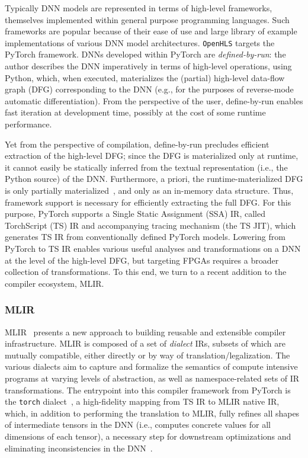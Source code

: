 \documentclass[10pt]{sig-alternate}
\begin{document}
Typically DNN models are represented in terms of high-level frameworks,
themselves implemented within general purpose programming languages.
Such frameworks are popular because of their ease of use and large
library of example implementations of various DNN model architectures.
\texttt{OpenHLS} targets the PyTorch framework.
DNNs developed within PyTorch are \emph{defined-by-run}:
the author describes the DNN imperatively in terms of high-level operations,
using Python, which, when executed, materializes the (partial) high-level
data-flow graph (DFG) corresponding to the DNN (e.g., for the purposes
of reverse-mode automatic differentiation). From the perspective of
the user, define-by-run enables fast iteration at development time,
possibly at the cost of some runtime performance.

Yet from the perspective of compilation, define-by-run
precludes efficient extraction of the high-level DFG; since the DFG
is materialized only at runtime, it cannot easily be statically inferred from
the textual representation (i.e., the Python source) of the DNN. Furthermore,
a priori, the runtime-materialized DFG is only partially materialized~\cite{paszke2017automatic},
and only as an in-memory data structure. Thus, framework support
is necessary for efficiently extracting the full DFG. For this purpose, PyTorch
supports a Single Static Assignment (SSA) IR, called TorchScript (TS)
IR and accompanying tracing mechanism (the TS JIT), which generates
TS IR from conventionally defined PyTorch models. Lowering from PyTorch
to TS IR enables various useful analyses and transformations on a
DNN at the level of the high-level DFG, but targeting FPGAs requires
a broader collection of transformations. To this end, we turn to a
recent addition to the compiler ecosystem, MLIR.

\subsubsection{MLIR}\label{subsec:MLIR}

MLIR~\cite{https://doi.org/10.48550/arxiv.2002.11054}
presents a new approach to building reusable and extensible compiler
infrastructure. MLIR is composed of a set of \emph{dialect} IRs, subsets
of which are mutually compatible, either directly or by way of translation/legalization.
The various dialects aim to capture and formalize the semantics of
compute intensive programs at varying levels of abstraction, as well
as namespace-related sets of IR transformations. The entrypoint into
this compiler framework from PyTorch is the \texttt{torch} dialect~\cite{torch-mlir}, a high-fidelity mapping from TS IR to MLIR native IR, which, in addition to performing the translation to MLIR, fully
refines all shapes of intermediate tensors in the DNN (i.e., computes
concrete values for all dimensions of each tensor), a necessary step
for downstream optimizations and eliminating inconsistencies in the
DNN~\cite{https://doi.org/10.48550/arxiv.2203.08402}.
\end{document}
